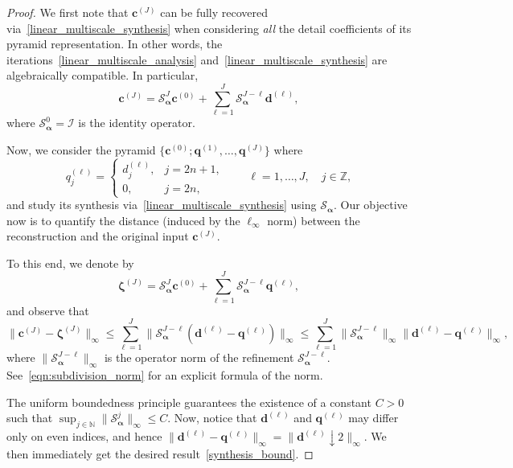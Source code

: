 \documentclass[12pt]{article}
\begin{document}
\begin{proof}
    We first note that $\boldsymbol{c}^{(J)}$ can be fully recovered via~\eqref{linear_multiscale_synthesis} when considering \emph{all} the detail coefficients of its pyramid representation. In other words, the iterations~\eqref{linear_multiscale_analysis} and~\eqref{linear_multiscale_synthesis} are algebraically compatible. In particular,
    \begin{equation*}
        \boldsymbol{c}^{(J)}=\mathcal{S}_{\boldsymbol{\alpha}}^{J}\boldsymbol{c}^{(0)} + \sum_{\ell=1}^J\mathcal{S}_{\boldsymbol{\alpha}}^{J-\ell}\boldsymbol{d}^{(\ell)},
    \end{equation*}
    where $\mathcal{S}_{\boldsymbol{\alpha}}^0=\mathcal{I}$ is the identity operator.

    Now, we consider the pyramid $\{\boldsymbol{c}^{(0)};\boldsymbol{q}^{(1)},\dots,\boldsymbol{q}^{(J)}\}$ where
    \begin{equation*}
        q^{(\ell)}_{j}=\begin{cases}
            d^{(\ell)}_j, & j=2n+1, \\
            0, & j=2n,
            \end{cases} \quad \quad\ell=1,\dots, J, \quad j\in\mathbb{Z},
    \end{equation*}
    and study its synthesis via~\eqref{linear_multiscale_synthesis} using $\mathcal{S}_{\boldsymbol{\alpha}}$. Our objective now is to quantify the distance (induced by the $\ell_\infty$ norm) between the reconstruction and the original input $\boldsymbol{c}^{(J)}$.

    To this end, we denote by 
    \begin{equation*}
        \boldsymbol{\zeta}^{(J)}=\mathcal{S}_{\boldsymbol{\alpha}}^{J}\boldsymbol{c}^{(0)} + \sum_{\ell=1}^J\mathcal{S}_{\boldsymbol{\alpha}}^{J-\ell}\boldsymbol{q}^{(\ell)},
    \end{equation*}
    and observe that
    \begin{equation*}
        \|\boldsymbol{c}^{(J)}-\boldsymbol{\zeta}^{(J)}\|_\infty \leq \sum_{\ell=1}^J\|\mathcal{S}_{\boldsymbol{\alpha}}^{J-\ell}(\boldsymbol{d}^{(\ell)}-\boldsymbol{q}^{(\ell)})\|_\infty \leq \sum_{\ell=1}^J\|\mathcal{S}_{\boldsymbol{\alpha}}^{J-\ell}\|_{\infty}\|\boldsymbol{d}^{(\ell)}-\boldsymbol{q}^{(\ell)}\|_\infty,
    \end{equation*}
    where $\|\mathcal{S}_{\boldsymbol{\alpha}}^{J-\ell}\|_{\infty}$ is the operator norm of the refinement $\mathcal{S}_{\boldsymbol{\alpha}}^{J-\ell}$. See~\eqref{eqn:subdivision_norm} for an explicit formula of the norm.

    The uniform boundedness principle guarantees the existence of a constant $C>0$ such that $\sup_{j\in\mathbb{N}} \|\mathcal{S}_{\boldsymbol{\alpha}}^j\|_{\infty}\leq C$. Now, notice that $\boldsymbol{d}^{(\ell)}$ and $\boldsymbol{q}^{(\ell)}$ may differ only on even indices, and hence $\|\boldsymbol{d}^{(\ell)}-\boldsymbol{q}^{(\ell)}\|_\infty=\|\boldsymbol{d}^{(\ell)}\downarrow 2\|_\infty$. We then immediately get the desired result~\eqref{synthesis_bound}.
\end{proof}
\end{document}
